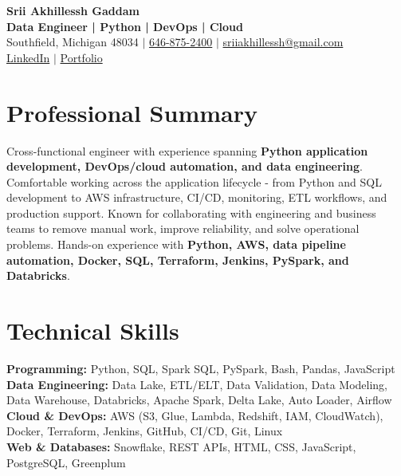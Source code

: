 \documentclass[letterpaper,10pt]{article}
\begin{document}
\fontsize{9.35pt}{10.45pt}\selectfont

\begin{center}
    {\LARGE \textbf{Srii Akhillessh Gaddam}} \\[-1pt]
    \textbf{Data Engineer | Python | DevOps | Cloud} \\[2pt]
    Southfield, Michigan 48034 $|$
    \href{tel:6468752400}{646-875-2400} $|$
    \href{mailto:sriiakhillessh@gmail.com}{sriiakhillessh@gmail.com} \\[1pt]
    \href{https://www.linkedin.com/in/srii-akhiilessh-gaddam-b48668191/}{LinkedIn} $|$
    \href{https://sriiakhillesshg.github.io/portfolio/}{Portfolio}
\end{center}
\vspace{-8pt}

\section{Professional Summary}
\small{Cross-functional engineer with experience spanning \textbf{Python application development, DevOps/cloud automation, and data engineering}. Comfortable working across the application lifecycle - from Python and SQL development to AWS infrastructure, CI/CD, monitoring, ETL workflows, and production support. Known for collaborating with engineering and business teams to remove manual work, improve reliability, and solve operational problems. Hands-on experience with \textbf{Python, AWS, data pipeline automation, Docker, SQL, Terraform, Jenkins, PySpark, and Databricks}.}

\section{Technical Skills}
\small{
\textbf{Programming:} Python, SQL, Spark SQL, PySpark, Bash, Pandas, JavaScript \\
\textbf{Data Engineering:} Data Lake, ETL/ELT, Data Validation, Data Modeling, Data Warehouse, Databricks, Apache Spark, Delta Lake, Auto Loader, Airflow \\
\textbf{Cloud \& DevOps:} AWS (S3, Glue, Lambda, Redshift, IAM, CloudWatch), Docker, Terraform, Jenkins, GitHub, CI/CD, Git, Linux \\
\textbf{Web \& Databases:} Snowflake, REST APIs, HTML, CSS, JavaScript, PostgreSQL, Greenplum
}
\end{document}
